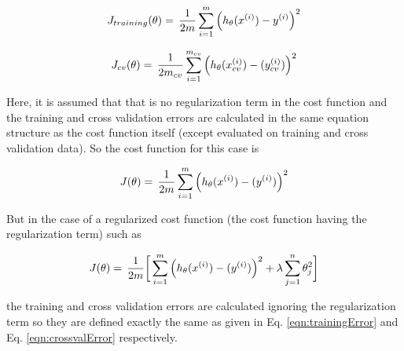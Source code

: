 \begin{equation}{\label{eqn:trainingError}}
J_{training}(\theta)
=\,
\frac{1}{2m} \sum\limits_{i=1}^{m} \Big(h_\theta(x^{(i)}) - y^{(i)}\Big)^2  
\end{equation} 

\begin{equation}{\label{eqn:crossvalError}}
J_{cv}(\theta)
=\,
\frac{1}{2m_{cv}} \sum\limits_{i=1}^{m_{cv}} \Big(h_\theta(x_{cv}^{(i)}) - (y_{cv}^{(i)})\Big)^2  
\end{equation} 

Here, it is assumed that that is no regularization term in the cost function and the training and cross validation errors are calculated in the same equation structure as the cost function itself (except evaluated on training and cross validation data). 
So the cost function for this case is

\begin{equation}{\label{eqn:costFuncLinearRegression}}
J(\theta)
=\,
\frac{1}{2m} \sum\limits_{i=1}^{m} \Big(h_\theta(x^{(i)}) - (y^{(i)})\Big)^2  
\end{equation} 

But in the case of a regularized cost function (the cost function having the regularization term) such as

\begin{equation}{\label{eqn:costFuncRegularized}}
J(\theta)
=\,
\frac{1}{2m} \bigg[ \sum\limits_{i=1}^{m} \Big(h_\theta(x^{(i)}) - (y^{(i)})\Big)^2 +\lambda \sum\limits_{j=1}^{n} \theta_j^2 \bigg] 
\end{equation} 

the training and cross validation errors are calculated ignoring the regularization term so they are defined exactly the same as given in Eq. \ref{eqn:trainingError} and Eq. \ref{eqn:crossvalError} respectively.

